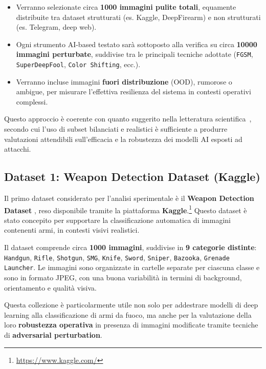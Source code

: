 \begin{itemize}
    \item Verranno selezionate circa \textbf{1000 immagini pulite totali}, equamente distribuite tra dataset strutturati (es. Kaggle, DeepFirearm) e non strutturati (es. Telegram, deep web).
    \item Ogni strumento AI-based  testato sarà sottoposto alla verifica su circa \textbf{10000 immagini perturbate}, suddivise tra le principali tecniche adottate (\texttt{FGSM}, \texttt{SuperDeepFool}, \texttt{Color Shifting}, ecc.).
    \item Verranno incluse immagini \textbf{fuori distribuzione} (OOD), rumorose o ambigue, per misurare l’effettiva resilienza del sistema in contesti operativi complessi.
\end{itemize}

Questo approccio è coerente con quanto suggerito nella letteratura scientifica~\cite{goodfellow2014explaining,biggio2018wild}, secondo cui l’uso di subset bilanciati e realistici è sufficiente a produrre valutazioni attendibili sull'efficacia e la robustezza dei modelli AI esposti ad attacchi.



\subsection*{Dataset 1: Weapon Detection Dataset (Kaggle)}
Il primo dataset considerato per l’analisi sperimentale è il \textbf{Weapon Detection Dataset} \cite{Sanyal2023KaggleWeapon}, reso disponibile tramite la piattaforma \textbf{Kaggle}.\footnote{\url{https://www.kaggle.com/}} Questo dataset è stato concepito per supportare la classificazione automatica di immagini contenenti armi, in contesti visivi realistici.

Il dataset comprende circa \textbf{1000 immagini}, suddivise in \textbf{9 categorie distinte}: \texttt{Handgun}, \texttt{Rifle}, \texttt{Shotgun}, \texttt{SMG}, \texttt{Knife}, \texttt{Sword}, \texttt{Sniper}, \texttt{Bazooka}, \texttt{Grenade Launcher}. Le immagini sono organizzate in cartelle separate per ciascuna classe e sono in formato JPEG, con una buona variabilità in termini di background, orientamento e qualità visiva.

Questa collezione è particolarmente utile non solo per addestrare modelli di deep learning alla classificazione di armi da fuoco, ma anche per la valutazione della loro \textbf{robustezza operativa} in presenza di immagini modificate tramite tecniche di \textbf{adversarial perturbation}.





